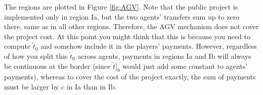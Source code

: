 \documentclass[a4paper]{article}
\begin{document}
The regions are plotted in Figure \ref{fig:AGV}. Note that the public project is implemented only in region Ia, but the two agents' transfers sum up to zero there, same as in all other regions. Therefore, the AGV mechanism does not cover the project cost.
At this point you might think that this is because you need to compute $\tilde{t}_0$ and somehow include it in the players' payments. However, regardless of how you split this $\tilde{t}_0$ across agents, payments in regions Ia and Ib will always be continuous at the border (since $\tilde{t}]_0$ would just add some constant to agents' payments), whereas to cover the cost of the project exactly, the sum of payments must be larger by $c$ in Ia than in Ib.



\end{document}
